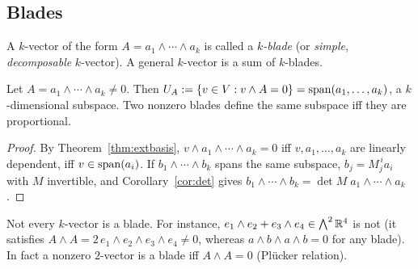 \subsection{Blades}\label{sec:blades}
\begin{definition}[Blade]
A $k$-vector of the form $A=a_1\wedge\cdots\wedge a_k$ is called a \emph{$k$-blade} (or \emph{simple}, \emph{decomposable} $k$-vector).
A general $k$-vector is a sum of $k$-blades.
\end{definition}

\begin{proposition}\label{prop:blade}
Let $A=a_1\wedge\cdots\wedge a_k\neq0$. Then $U_A:=\{v\in V: v\wedge A=0\}=\mathrm{span}(a_1,\dots,a_k)$, a $k$-dimensional subspace.
Two nonzero blades define the same subspace iff they are proportional.
\end{proposition}
\begin{proof}
By Theorem~\ref{thm:extbasis}, $v\wedge a_1\wedge\cdots\wedge a_k=0$ iff $v,a_1,\dots,a_k$ are linearly dependent, iff $v\in\mathrm{span}(a_i)$. If $b_1\wedge\cdots\wedge b_k$ spans the same subspace, $b_j=M_j^{\,i}a_i$ with $M$ invertible, and Corollary~\ref{cor:det} gives $b_1\wedge\cdots\wedge b_k=\det M\;a_1\wedge\cdots\wedge a_k$.
\end{proof}

Not every $k$-vector is a blade. For instance, $e_1\wedge e_2+e_3\wedge e_4\in\bigwedge^2\mathbb{R}^4$ is not (it satisfies $A\wedge A=2\,e_1\wedge e_2\wedge e_3\wedge e_4\neq0$, whereas $a\wedge b\wedge a\wedge b=0$ for any blade). In fact a nonzero $2$-vector is a blade iff $A\wedge A=0$ (Pl\"ucker relation).



